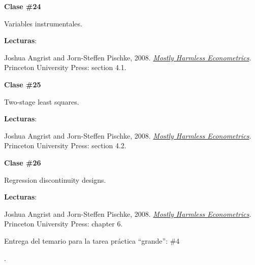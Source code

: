 \documentclass[letterpaper]{article}
\renewenvironment{itemize}{
  \begin{list}{}{
    \setlength{\leftmargin}{1.5em}
  }
}{
  \end{list}
}
\begin{document}
\begin{enumerate}
      \begin{itemize} 
        \item[$\bullet$] {\bf Clase \#24}
          \begin{itemize} 
            \item[$\circ$] Variables instrumentales.
            \item[$\circ$] {\bf Lecturas}: 
              \begin{itemize}
                \item[$\diamond$] Joshua Angrist and Jorn-Steffen Pischke, 2008. \href{https://github.com/hbahamonde/Metodos_de_Investigacion/raw/master/Readings/MHE.pdf}{\emph{Mostly Harmless Econometrics}}. Princeton University Press: section 4.1.
              \end{itemize}
          \end{itemize}
      \end{itemize}




      \begin{itemize} 
        \item[$\bullet$] {\bf Clase \#25}
          \begin{itemize} 
            \item[$\circ$] Two-stage least squares.
            \item[$\circ$] {\bf Lecturas}: 
              \begin{itemize}
                \item[$\diamond$] Joshua Angrist and Jorn-Steffen Pischke, 2008. \href{https://github.com/hbahamonde/Metodos_de_Investigacion/raw/master/Readings/MHE.pdf}{\emph{Mostly Harmless Econometrics}}. Princeton University Press: section 4.2.
              \end{itemize}
          \end{itemize}
      \end{itemize}



      \begin{itemize} 
        \item[$\bullet$] {\bf Clase \#26}
          \begin{itemize} 
            \item[$\circ$] Regression discontinuity designs.
            \item[$\circ$] {\bf Lecturas}: 
              \begin{itemize}
                \item[$\diamond$] Joshua Angrist and Jorn-Steffen Pischke, 2008. \href{https://github.com/hbahamonde/Metodos_de_Investigacion/raw/master/Readings/MHE.pdf}{\emph{Mostly Harmless Econometrics}}. Princeton University Press: chapter 6.
                {\color{orange}\item[$\bigstar$] Entrega del temario para la tarea pr\'actica ``grande'': \#4}.
              \end{itemize}
          \end{itemize}
      \end{itemize}



\end{enumerate}
\end{document}
